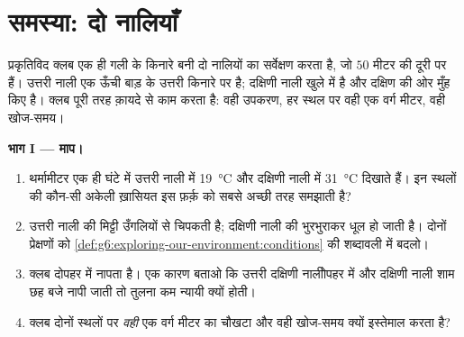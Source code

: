 \section{समस्या: दो नालियाँ}

\begin{problem}\label{pb:g6:exploring-our-environment:1}
प्रकृतिविद क्लब एक ही गली के किनारे बनी दो नालियों का सर्वेक्षण करता
है, जो $50$ मीटर की दूरी पर हैं। उत्तरी नाली एक ऊँची बाड़ के उत्तरी किनारे
पर है; दक्षिणी नाली खुले में है और दक्षिण की ओर मुँह किए है। क्लब पूरी तरह
क़ायदे से काम करता है: वही उपकरण, हर स्थल पर वही एक वर्ग मीटर, वही
खोज-समय।

\medskip\noindent\textbf{भाग I --- माप।}
\begin{enumerate}
  \item थर्मामीटर एक ही घंटे में उत्तरी नाली में \qty{19}{\degreeCelsius}
        और दक्षिणी नाली में \qty{31}{\degreeCelsius} दिखाते हैं। इन स्थलों
        की कौन-सी अकेली ख़ासियत इस फ़र्क़ को सबसे अच्छी तरह समझाती
        है?
  \item उत्तरी नाली की मिट्टी उँगलियों से चिपकती है; दक्षिणी नाली की भुरभुराकर
        धूल हो जाती है। दोनों प्रेक्षणों को
        \cref{def:g6:exploring-our-environment:conditions} की
        शब्दावली में बदलो।
  \item क्लब दोपहर में नापता है। एक कारण बताओ कि उत्तरी दक्षिणी नालीोपहर में और
        दक्षिणी नाली शाम छह बजे नापी जाती तो तुलना कम न्यायी क्यों होती।
  \item क्लब दोनों स्थलों पर \emph{वही} एक वर्ग मीटर का चौखटा और वही
        खोज-समय क्यों इस्तेमाल करता है?
\end{enumerate}


\end{problem}
